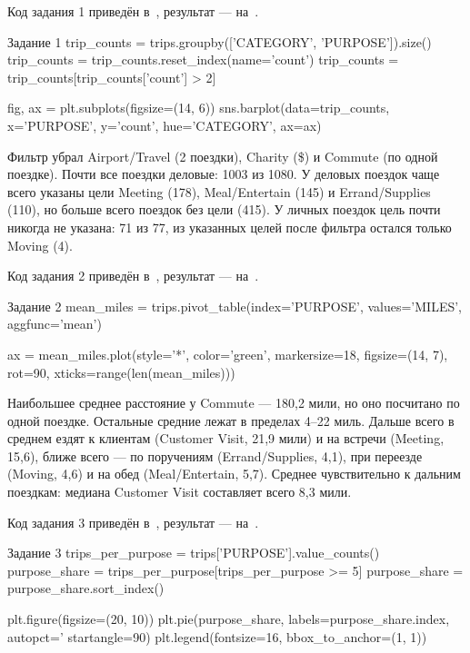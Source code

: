 \documentclass[a4paper,14pt]{extarticle}
\begin{document}
Код задания 1 приведён в~, результат — на~.

\begin{code}{Задание 1}
trip_counts = trips.groupby(['CATEGORY', 'PURPOSE']).size()
trip_counts = trip_counts.reset_index(name='count')
trip_counts = trip_counts[trip_counts['count'] > 2]

fig, ax = plt.subplots(figsize=(14, 6))
sns.barplot(data=trip_counts, x='PURPOSE', y='count',
            hue='CATEGORY', ax=ax)
\end{code}


Фильтр убрал Airport/Travel (2 поездки), Charity (\$) и Commute (по одной поездке). Почти все поездки деловые: 1003 из 1080. У деловых поездок чаще всего указаны цели Meeting (178), Meal/Entertain (145) и Errand/Supplies (110), но больше всего поездок без цели (415). У личных поездок цель почти никогда не указана: 71 из 77, из указанных целей после фильтра остался только Moving (4).

Код задания 2 приведён в~, результат — на~.

\begin{code}{Задание 2}
mean_miles = trips.pivot_table(index='PURPOSE', values='MILES',
                               aggfunc='mean')

ax = mean_miles.plot(style='*', color='green', markersize=18,
                     figsize=(14, 7), rot=90,
                     xticks=range(len(mean_miles)))
\end{code}


Наибольшее среднее расстояние у Commute — 180,2 мили, но оно посчитано по одной поездке. Остальные средние лежат в пределах 4–22 миль. Дальше всего в среднем ездят к клиентам (Customer Visit, 21,9 мили) и на встречи (Meeting, 15,6), ближе всего — по поручениям (Errand/Supplies, 4,1), при переезде (Moving, 4,6) и на обед (Meal/Entertain, 5,7). Среднее чувствительно к дальним поездкам: медиана Customer Visit составляет всего 8,3 мили.

Код задания 3 приведён в~, результат — на~.

\begin{code}{Задание 3}
trips_per_purpose = trips['PURPOSE'].value_counts()
purpose_share = trips_per_purpose[trips_per_purpose >= 5]
purpose_share = purpose_share.sort_index()

plt.figure(figsize=(20, 10))
plt.pie(purpose_share, labels=purpose_share.index,
        autopct='%
        startangle=90)
plt.legend(fontsize=16, bbox_to_anchor=(1, 1))
\end{code}
\end{document}
